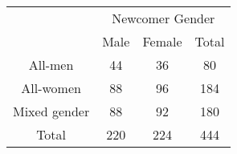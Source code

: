 \begin{table}[htbp]
\begin{tabular}{c c c c}
\toprule
                   &\multicolumn{3}{c}{Newcomer Gender}  \\
                   &      Male  &   Female &    Total    \\
\midrule
All-men            &      44 &         36 &       80     \\
\midrule
All-women          &      88 &         96 &      184   \\
\midrule
Mixed gender       &      88 &         92 &      180  \\
\midrule
Total              &      220 &       224 &      444  \\
\bottomrule
\end{tabular}
\end{table}

